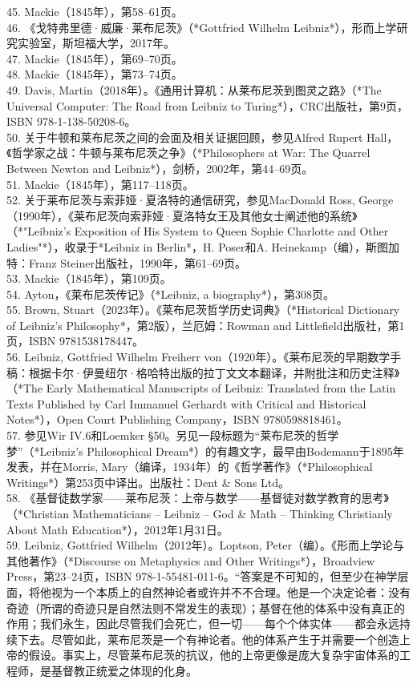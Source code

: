 45. Mackie（1845年），第58–61页。\\  
46. 《戈特弗里德·威廉·莱布尼茨》（*Gottfried Wilhelm Leibniz*），形而上学研究实验室，斯坦福大学，2017年。\\
47. Mackie（1845年），第69–70页。\\
48. Mackie（1845年），第73–74页。\\
49. Davis, Martin（2018年）。《通用计算机：从莱布尼茨到图灵之路》（*The Universal Computer: The Road from Leibniz to Turing*），CRC出版社，第9页，ISBN 978-1-138-50208-6。\\
50. 关于牛顿和莱布尼茨之间的会面及相关证据回顾，参见Alfred Rupert Hall，《哲学家之战：牛顿与莱布尼茨之争》（*Philosophers at War: The Quarrel Between Newton and Leibniz*），剑桥，2002年，第44–69页。\\
51. Mackie（1845年），第117–118页。\\
52. 关于莱布尼茨与索菲娅·夏洛特的通信研究，参见MacDonald Ross, George（1990年），《莱布尼茨向索菲娅·夏洛特女王及其他女士阐述他的系统》（*"Leibniz's Exposition of His System to Queen Sophie Charlotte and Other Ladies"*），收录于*Leibniz in Berlin*，H. Poser和A. Heinekamp（编），斯图加特：Franz Steiner出版社，1990年，第61–69页。\\
53. Mackie（1845年），第109页。\\
54. Ayton，《莱布尼茨传记》（*Leibniz, a biography*），第308页。\\
55. Brown, Stuart（2023年）。《莱布尼茨哲学历史词典》（*Historical Dictionary of Leibniz's Philosophy*，第2版），兰厄姆：Rowman and Littlefield出版社，第1页，ISBN 9781538178447。\\
56. Leibniz, Gottfried Wilhelm Freiherr von（1920年）。《莱布尼茨的早期数学手稿：根据卡尔·伊曼纽尔·格哈特出版的拉丁文文本翻译，并附批注和历史注释》（*The Early Mathematical Manuscripts of Leibniz: Translated from the Latin Texts Published by Carl Immanuel Gerhardt with Critical and Historical Notes*），Open Court Publishing Company，ISBN 9780598818461。\\
57. 参见Wir IV.6和Loemker §50。另见一段标题为“莱布尼茨的哲学梦”（*Leibniz's Philosophical Dream*）的有趣文字，最早由Bodemann于1895年发表，并在Morris, Mary（编译，1934年）的《哲学著作》（*Philosophical Writings*）第253页中译出。出版社：Dent & Sons Ltd。\\
58. 《基督徒数学家——莱布尼茨：上帝与数学——基督徒对数学教育的思考》（*Christian Mathematicians – Leibniz – God & Math – Thinking Christianly About Math Education*），2012年1月31日。\\
59. Leibniz, Gottfried Wilhelm（2012年）。Loptson, Peter（编）。《形而上学论与其他著作》（*Discourse on Metaphysics and Other Writings*），Broadview Press，第23–24页，ISBN 978-1-55481-011-6。“答案是不可知的，但至少在神学层面，将他视为一个本质上的自然神论者或许并不不合理。他是一个决定论者：没有奇迹（所谓的奇迹只是自然法则不常发生的表现）；基督在他的体系中没有真正的作用；我们永生，因此尽管我们会死亡，但一切——每个个体实体——都会永远持续下去。尽管如此，莱布尼茨是一个有神论者。他的体系产生于并需要一个创造上帝的假设。事实上，尽管莱布尼茨的抗议，他的上帝更像是庞大复杂宇宙体系的工程师，是基督教正统爱之体现的化身。\\
